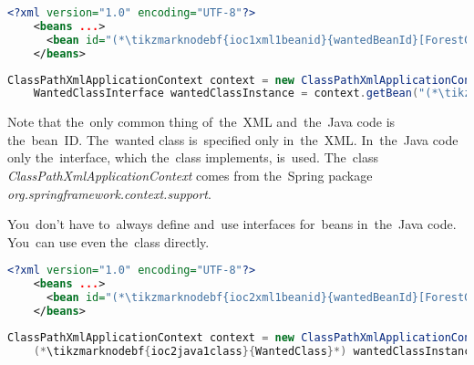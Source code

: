 \example
\begin{lstlisting}[language=XML, title={Configuration XML}]
    <?xml version="1.0" encoding="UTF-8"?>
    <beans ...>
      <bean id="(*\tikzmarknodebf{ioc1xml1beanid}{wantedBeanId}[ForestGreen]*)" class="package.subfolder.WantedClass"/>
    </beans>
\end{lstlisting}
\begin{lstlisting}[language=Java, title={Usage}]
    ClassPathXmlApplicationContext context = new ClassPathXmlApplicationContext("configurationFile.xml");
    WantedClassInterface wantedClassInstance = context.getBean("(*\tikzmarknodebf{ioc1java1beanid}{wantedBeanId}[ForestGreen]*)", WantedClassInterface.class);
\end{lstlisting}

\vspace{\baselineskip}
\noindent Note that the~only common thing of~the~XML and~the~Java code is the~bean~ID. The~wanted class is~specified only in~the~XML. In~the~Java code only the~interface, which the~class implements, is~used. The~class \textit{ClassPathXmlApplicationContext} comes from the~Spring package \textit{org.springframework.context.support}.

\note You~don't have to~always define and~use interfaces for~beans in~the~Java code. You~can use even the~class directly.
\begin{lstlisting}[language=XML, title={Configuration XML}]
    <?xml version="1.0" encoding="UTF-8"?>
    <beans ...>
      <bean id="(*\tikzmarknodebf{ioc2xml1beanid}{wantedBeanId}[ForestGreen]*)" class="package.subfolder.(*\tikzmarknodebf{ioc2xml1class}{WantedClass}[ForestGreen]*)"/>
    </beans>
\end{lstlisting}
\begin{lstlisting}[language=Java, title={Usage}]
    ClassPathXmlApplicationContext context = new ClassPathXmlApplicationContext("configurationFile.xml");
    (*\tikzmarknodebf{ioc2java1class}{WantedClass}*) wantedClassInstance = context.getBean("(*\tikzmarknodebf{ioc2java1beanid}{wantedBeanId}[ForestGreen]*)", (*\tikzmarknodebf{ioc2java1class2}{WantedClass}*).class);
\end{lstlisting}

